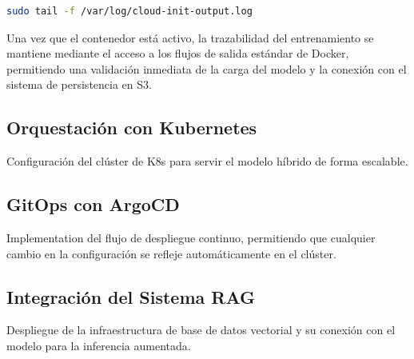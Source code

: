 \begin{lstlisting}[language=bash, caption={Comando para monitorizar el aprovisionamiento inicial.}]
sudo tail -f /var/log/cloud-init-output.log
\end{lstlisting}

Una vez que el contenedor está activo, la trazabilidad del entrenamiento se mantiene mediante el acceso a los flujos de salida estándar de Docker, permitiendo una validación inmediata de la carga del modelo y la conexión con el sistema de persistencia en S3.

\subsection{Orquestación con Kubernetes}
Configuración del clúster de K8s para servir el modelo híbrido de forma escalable.

\subsection{GitOps con ArgoCD}
Implementation del flujo de despliegue continuo, permitiendo que cualquier cambio en la configuración se refleje automáticamente en el clúster.

\subsection{Integración del Sistema RAG}
Despliegue de la infraestructura de base de datos vectorial y su conexión con el modelo para la inferencia aumentada.
